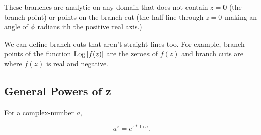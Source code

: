 \documentclass{article}
\begin{document}
These branches are analytic on any domain that does not contain $z = 0$ (the branch point) or points on the branch cut (the half-line through $z=0$ making an angle of $\phi$ radians ith the positive real axis.)

We can define branch cuts that aren't straight lines too. For example, branch points of the function $\operatorname{Log}{ \left[f(z)\right] }$ are the zeroes of $f(z)$ and branch cuts are where $f(z)$ is real and negative.

\subsection{General Powers of z}

For a \@{complex-number} $a,$

\[ a^z = e^{z * \ln{a}}. \]
\end{document}
